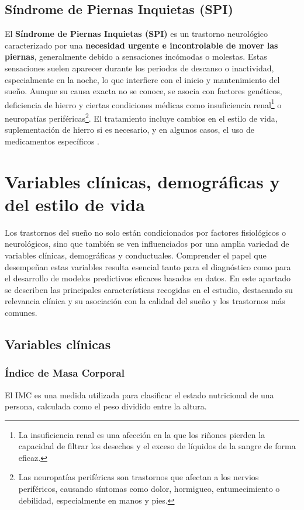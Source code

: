 \subsection{Síndrome de Piernas Inquietas (SPI)}
El \textbf{Síndrome de Piernas Inquietas (SPI)} es un trastorno neurológico caracterizado por una \textbf{necesidad urgente e incontrolable de mover las piernas}, generalmente debido a sensaciones incómodas o molestas. Estas sensaciones suelen aparecer durante los periodos de descanso o inactividad, especialmente en la noche, lo que interfiere con el inicio y mantenimiento del sueño. Aunque su causa exacta no se conoce, se asocia con factores genéticos, deficiencia de hierro y ciertas condiciones médicas como insuficiencia renal\footnote{La insuficiencia renal es una afección en la que los riñones pierden la capacidad de filtrar los desechos y el exceso de líquidos de la sangre de forma eficaz.} o neuropatías periféricas\footnote{Las neuropatías periféricas son trastornos que afectan a los nervios periféricos, causando síntomas como dolor, hormigueo, entumecimiento o debilidad, especialmente en manos y pies.}. El tratamiento incluye cambios en el estilo de vida, suplementación de hierro si es necesario, y en algunos casos, el uso de medicamentos específicos \cite{ninds_spi}.

\section{Variables clínicas, demográficas y del estilo de vida}
Los trastornos del sueño no solo están condicionados por factores fisiológicos o neurológicos, sino que también se ven influenciados por una amplia variedad de variables clínicas, demográficas y conductuales. Comprender el papel que desempeñan estas variables resulta esencial tanto para el diagnóstico como para el desarrollo de modelos predictivos eficaces basados en datos. En este apartado se describen las principales características recogidas en el estudio, destacando su relevancia clínica y su asociación con la calidad del sueño y los trastornos más comunes.

\subsection{Variables clínicas}
\subsubsection{Índice de Masa Corporal}
El IMC es una medida utilizada para clasificar el estado nutricional de una persona, calculada como el peso dividido entre la altura.

